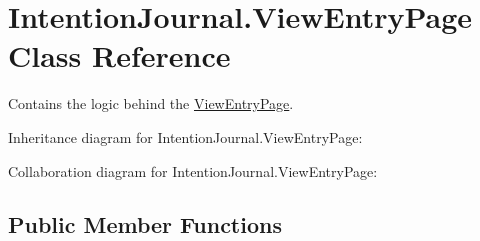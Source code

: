 \hypertarget{class_intention_journal_1_1_view_entry_page}{}\section{Intention\+Journal.\+View\+Entry\+Page Class Reference}
\label{class_intention_journal_1_1_view_entry_page}


Contains the logic behind the \hyperlink{class_intention_journal_1_1_view_entry_page}{View\+Entry\+Page}.  




Inheritance diagram for Intention\+Journal.\+View\+Entry\+Page\+:


Collaboration diagram for Intention\+Journal.\+View\+Entry\+Page\+:
\subsection*{Public Member Functions}
